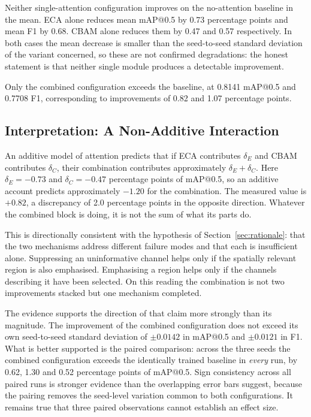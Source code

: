 \documentclass[MScCS]{uccthesis}
\begin{document}
Neither single-attention configuration improves on the no-attention baseline in
the mean. ECA alone reduces mean mAP@0.5 by 0.73 percentage points and mean F1
by 0.68. CBAM alone reduces them by 0.47 and 0.57 respectively. In both cases
the mean decrease is smaller than the seed-to-seed standard deviation of the
variant concerned, so these are not confirmed degradations: the honest
statement is that neither single module produces a detectable improvement.

Only the combined configuration exceeds the baseline, at 0.8141 mAP@0.5 and
0.7708 F1, corresponding to improvements of 0.82 and 1.07 percentage points.

\subsection{Interpretation: A Non-Additive Interaction}

An additive model of attention predicts that if ECA contributes $\delta_E$ and
CBAM contributes $\delta_C$, their combination contributes approximately
$\delta_E + \delta_C$. Here $\delta_E = -0.73$ and $\delta_C = -0.47$
percentage points of mAP@0.5, so an additive account predicts approximately
$-1.20$ for the combination. The measured value is $+0.82$, a discrepancy of
2.0 percentage points in the opposite direction. Whatever the combined block is
doing, it is not the sum of what its parts do.

This is directionally consistent with the hypothesis of
Section~\ref{sec:rationale}: that the two mechanisms address different failure
modes and that each is insufficient alone. Suppressing an uninformative channel
helps only if the spatially relevant region is also emphasised. Emphasising a
region helps only if the channels describing it have been selected. On this
reading the combination is not two improvements stacked but one mechanism
completed.

The evidence supports the direction of that claim more strongly than its
magnitude. The improvement of the combined configuration does not exceed its
own seed-to-seed standard deviation of $\pm 0.0142$ in mAP@0.5 and $\pm 0.0121$
in F1. What is better supported is the paired comparison: across the three
seeds the combined configuration exceeds the identically trained baseline in
\emph{every} run, by 0.62, 1.30 and 0.52 percentage points of mAP@0.5. Sign
consistency across all paired runs is stronger evidence than the overlapping
error bars suggest, because the pairing removes the seed-level variation common
to both configurations. It remains true that three paired observations cannot
establish an effect size.
\end{document}
